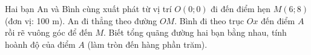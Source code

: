 \begin{bt}%
	Hai bạn An và Bình cùng xuất phát từ vị trí $O(0;0)$ đi đến điểm hẹn $M(6;8)$ (đơn vị: 100 m). An đi thẳng theo đường $OM$. Bình đi theo trục $Ox$ đến điểm $A$ rồi rẽ vuông góc để đến $M$. Biết tổng quãng đường hai bạn bằng nhau, tính hoành độ của điểm $A$ (làm tròn đến hàng phần trăm).
	
\end{bt}


